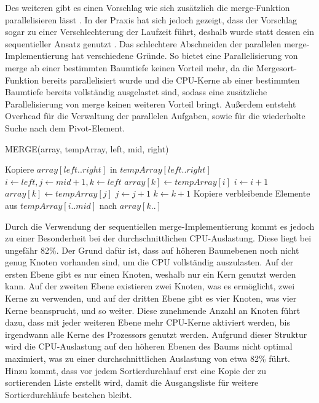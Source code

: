 \documentclass[fontsize=12pt,paper=a4,twoside=semi,parskip=half-,headsepline,headinclude]{scrreprt}
\begin{document}
Des weiteren gibt  es einen Vorschlag wie sich zusätzlich die merge-Funktion parallelisieren lässt \cite[S. 776-782]{Cormen2022}. In der Praxis hat sich jedoch gezeigt, dass der Vorschlag sogar zu einer Verschlechterung der Laufzeit führt, deshalb wurde statt dessen ein sequentieller Ansatz genutzt \cite[S. 36]{Cormen2022}. Das schlechtere Abschneiden der parallelen merge-Implementierung hat verschiedene Gründe. So bietet eine Parallelisierung von merge ab einer bestimmten Baumtiefe keinen Vorteil mehr, da die Mergesort-Funktion bereits parallelisiert wurde und  die CPU-Kerne ab einer bestimmten Baumtiefe bereits vollständig ausgelastet sind, sodass eine zusätzliche Parallelisierung von merge keinen weiteren Vorteil bringt. Außerdem entsteht Overhead für die Verwaltung der parallelen Aufgaben, sowie für die wiederholte Suche nach dem Pivot-Element.

\begin{algorithm}[H]
	\caption{MERGE(array, tempArray, left, mid, right)}
	\begin{algorithmic}[1]
		\STATE Kopiere $array[left..right]$ in $tempArray[left..right]$
		\STATE $i \gets left, j \gets mid + 1, k \gets left$
		\STATE $array[k] \gets tempArray[i]$
		\STATE $i \gets i + 1$
		\ELSE
		\STATE $array[k] \gets tempArray[j]$
		\STATE $j \gets j + 1$
		\ENDIF
		\STATE $k \gets k + 1$
		\ENDWHILE
		\STATE Kopiere verbleibende Elemente aus $tempArray[i..mid]$ nach $array[k..]$
	\end{algorithmic}
\end{algorithm}

Durch die Verwendung der sequentiellen merge-Implementierung kommt es jedoch zu einer Besonderheit bei der durchschnittlichen CPU-Auslastung. Diese liegt bei ungefähr 82\%. Der Grund dafür ist, dass auf höheren Baumebenen noch nicht genug Knoten vorhanden sind, um die CPU vollständig auszulasten. Auf der ersten Ebene gibt es nur einen Knoten, weshalb nur ein Kern genutzt werden kann. Auf der zweiten Ebene existieren zwei Knoten, was es ermöglicht, zwei Kerne zu verwenden, und auf der dritten Ebene gibt es vier Knoten, was vier Kerne beansprucht, und so weiter. Diese zunehmende Anzahl an Knoten führt dazu, dass mit jeder weiteren Ebene mehr CPU-Kerne aktiviert werden, bis irgendwann alle Kerne des Prozessors genutzt werden. Aufgrund dieser Struktur wird die CPU-Auslastung auf den höheren Ebenen des Baums nicht optimal maximiert, was zu einer durchschnittlichen Auslastung von etwa 82\% führt. Hinzu kommt, dass vor jedem Sortierdurchlauf erst eine Kopie der zu sortierenden Liste erstellt wird, damit die Ausgangsliste für weitere Sortierdurchläufe bestehen bleibt. 
\end{document}
